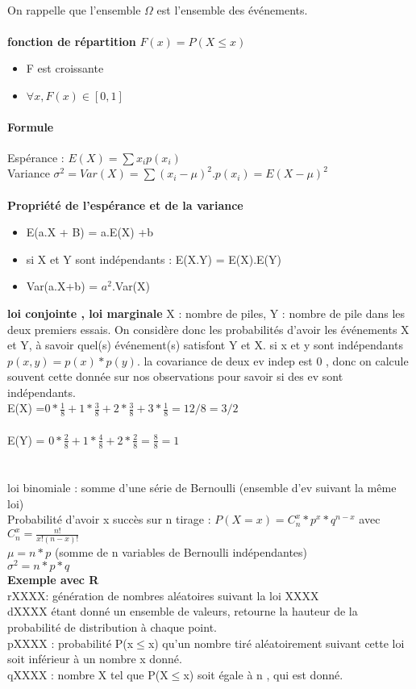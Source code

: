 \documentclass{article}
\begin{document}
\paragraph{}On rappelle que l'ensemble $\Omega$ est l'ensemble des événements.\\\\\indent\textbf{fonction de répartition} $F(x) = P(X\leq x)$
\begin{itemize}
\item F est croissante
\item $\forall x , F(x) \in [0,1]$
\end{itemize}
\paragraph{Formule}
Espérance  : $E(X)= \sum x_i p(x_i)$\\
Variance $\sigma^2 = Var(X) = \sum (x_i -\mu)^2 . p(x_i) = E(X-\mu)^2$\\\\\textbf{Propriété de l'espérance et de la variance}
\begin{itemize}
\item E(a.X + B) = a.E(X) +b
\item si X et Y sont indépendants : E(X.Y) = E(X).E(Y)
\item Var(a.X+b) = $a^2$.Var(X)
\end{itemize}
\indent \textbf{loi conjointe , loi marginale}
X : nombre de piles, Y : nombre de pile dans les deux premiers essais. On considère donc les probabilités d'avoir les événements X et Y, à savoir quel(s) événement(s) satisfont Y et X. si x et y sont indépendants $ p(x,y)  = p(x) * p(y)$. la covariance de deux ev indep est  0 , donc on calcule souvent cette donnée sur nos observations pour savoir si des ev sont indépendants.\\E(X) =$0*\frac{1}{8}+1*\frac{3}{8}+2*\frac{3}{8}+3*\frac{1}{8} = 12/8 = 3/2$\\\\E(Y) = $0*\frac{2}{8}+1*\frac{4}{8}+2*\frac{2}{8}= \frac{8}{8} = 1$\\\\
\\loi binomiale : somme d'une série de Bernoulli (ensemble d'ev suivant la même loi)\\Probabilité d'avoir x succès sur n tirage : $P(X=x)=C_n^x * p^x * q^{n-x}$ avec $C_n^x = \frac{n!}{x!(n-x)!}$\\$\mu = n * p$ (somme de n variables de Bernoulli indépendantes)\\$\sigma^2 = n*p*q$\\\textbf{Exemple avec R} \\ 
rXXXX:  génération de nombres aléatoires suivant la loi XXXX\\dXXXX étant donné un ensemble de valeurs, retourne la hauteur de la probabilité de distribution à chaque point.\\pXXXX : probabilité P(x$\leq$x) qu'un nombre tiré aléatoirement suivant cette loi soit inférieur à un nombre x donné.\\qXXXX : nombre X tel que P(X$\leq$x) soit égale à n , qui est donné.
\end{document}
